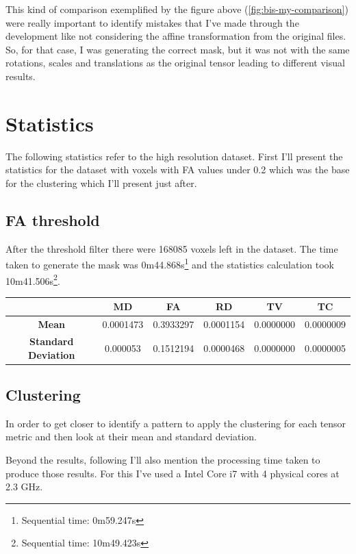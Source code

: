 \documentclass[a4paper,11pt]{report}
\begin{document}
  This kind of comparison exemplified by the figure above (\ref{fig:bis-my-comparison}) were really important to identify mistakes that I've made through the development like not considering the affine transformation from the original files. So, for that case, I was generating the correct mask, but it was not with the same rotations, scales and translations as the original tensor leading to different visual results.

  \section{Statistics}
  The following statistics refer to the high resolution dataset. First I'll present the statistics for the dataset with voxels with FA values under 0.2 which was the base for the clustering which I'll present just after.

    \subsection{FA threshold}\label{subsec:fa-threshold}
    After the threshold filter there were 168085 voxels left in the dataset. The time taken to generate the mask was 0m44.868s\footnote{Sequential time: 0m59.247s} and the statistics calculation took 10m41.506s\footnote{Sequential time: 10m49.423s}.

    \begin{tabular}{| c | c | c | c | c | c |}
      \hline
        & \textbf{MD} & \textbf{FA} & \textbf{RD} & \textbf{TV} & \textbf{TC} \\ \hline
       \textbf{Mean} & 0.0001473 & 0.3933297 & 0.0001154 & 0.0000000 & 0.0000009 \\ \hline
       \textbf{Standard Deviation} & 0.000053 & 0.1512194 & 0.0000468 & 0.0000000 & 0.0000005 \\ \hline 
    \end{tabular}

    \subsection{Clustering}
    In order to get closer to identify a pattern to apply the clustering for each tensor metric and then look at their mean and standard deviation.

    Beyond the results, following I'll also mention the processing time taken to produce those results. For this I've used a Intel Core i7 with 4 physical cores at 2.3 GHz.
\end{document}
